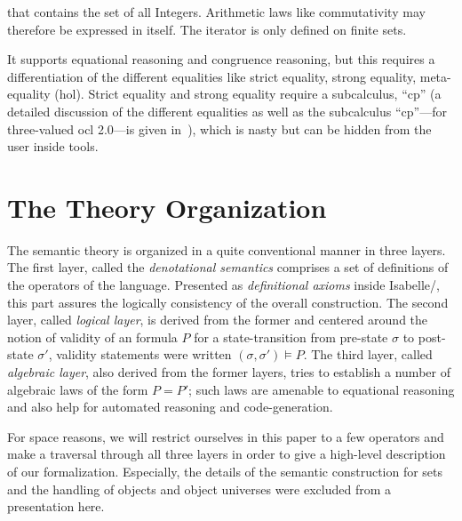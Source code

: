 \begin{compactenum}
  that contains the set of all Integers.  Arithmetic laws like
  commutativity may therefore be expressed in \OCL itself.  The
  iterator is only defined on finite sets.
\item It supports equational reasoning and congruence reasoning, but
  this requires a differentiation of the different equalities like
  strict equality, strong equality, meta-equality (\acs{hol}). Strict
  equality and strong equality require a subcalculus, ``cp'' (a
  detailed discussion of the different equalities as well as the
  subcalculus ``cp''---for three-valued \acs{ocl} 2.0---is given
  in~\cite{brucker.ea:semantics:2009}), which is nasty but can be
  hidden from the user inside tools.
\end{compactenum}

\section{The Theory Organization}
The semantic theory is organized in a quite conventional manner in
three layers. The first layer, called the \emph{denotational
  semantics} comprises a set of definitions of the operators of the
language.  Presented as \emph{definitional axioms} inside
Isabelle/\HOL, this part assures the logically consistency of the
overall construction. The second layer, called \emph{logical layer},
is derived from the former and centered around the notion of validity
of an \OCL formula $P$ for a state-transition from pre-state $\sigma$
to post-state $\sigma'$, validity statements were written $(\sigma,
\sigma') \models P$.  The third layer, called \emph{algebraic layer},
also derived from the former layers, tries to establish a number of
algebraic laws of the form $P = P'$; such laws are amenable to
equational reasoning and also help for automated reasoning and
code-generation.

For space reasons, we will restrict ourselves in this paper to a few
operators and make a traversal through all three layers in order to
give a high-level description of our formalization.  Especially, the
details of the semantic construction for sets and the handling of
objects and object universes were excluded from a presentation here.

